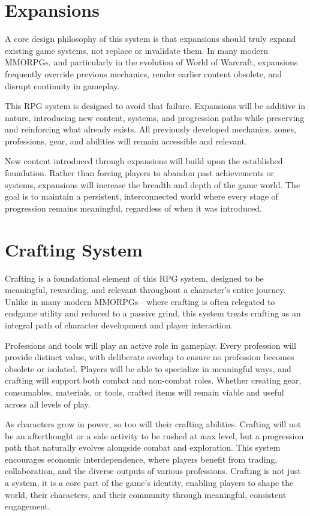 \section{Expansions}

A core design philosophy of this system is that expansions should truly expand existing game systems, not replace or invalidate them. In many modern MMORPGs, and particularly in the evolution of World of Warcraft, expansions frequently override previous mechanics, render earlier content obsolete, and disrupt continuity in gameplay.

This RPG system is designed to avoid that failure. Expansions will be additive in nature, introducing new content, systems, and progression paths while preserving and reinforcing what already exists. All previously developed mechanics, zones, professions, gear, and abilities will remain accessible and relevant.

New content introduced through expansions will build upon the established foundation. Rather than forcing players to abandon past achievements or systems, expansions will increase the breadth and depth of the game world. The goal is to maintain a persistent, interconnected world where every stage of progression remains meaningful, regardless of when it was introduced.








\section{Crafting System}

Crafting is a foundational element of this RPG system, designed to be meaningful, rewarding, and relevant throughout a character's entire journey. Unlike in many modern MMORPGs—where crafting is often relegated to endgame utility and reduced to a passive grind, this system treats crafting as an integral path of character development and player interaction.

Professions and tools will play an active role in gameplay. Every profession will provide distinct value, with deliberate overlap to ensure no profession becomes obsolete or isolated. Players will be able to specialize in meaningful ways, and crafting will support both combat and non-combat roles. Whether creating gear, consumables, materials, or tools, crafted items will remain viable and useful across all levels of play.

As characters grow in power, so too will their crafting abilities. Crafting will not be an afterthought or a side activity to be rushed at max level, but a progression path that naturally evolves alongside combat and exploration. This system encourages economic interdependence, where players benefit from trading, collaboration, and the diverse outputs of various professions. Crafting is not just a system, it is a core part of the game's identity, enabling players to shape the world, their characters, and their community through meaningful, consistent engagement.










